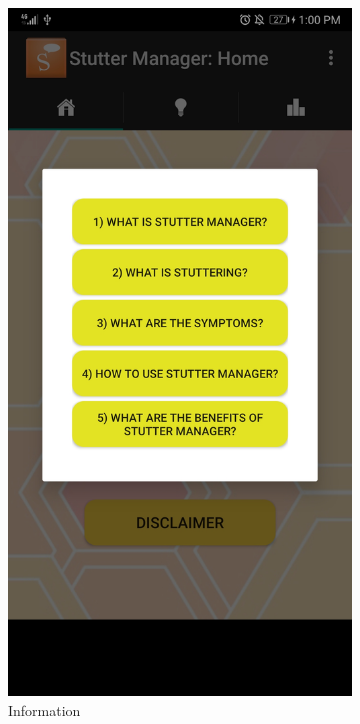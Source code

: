 \begin{appendices}
\begin{landscape}
\begin{figure}[h]
\begin{subfigure}{.25\textwidth}
    \includegraphics[width=.75\linewidth]{content/imgs/old_app_2.jpg}
    \caption{Information}
  \end{subfigure}%
  \begin{subfigure}{.25\textwidth}
    \centering

\end{subfigure}
\end{figure}
\end{landscape}
\end{appendices}
